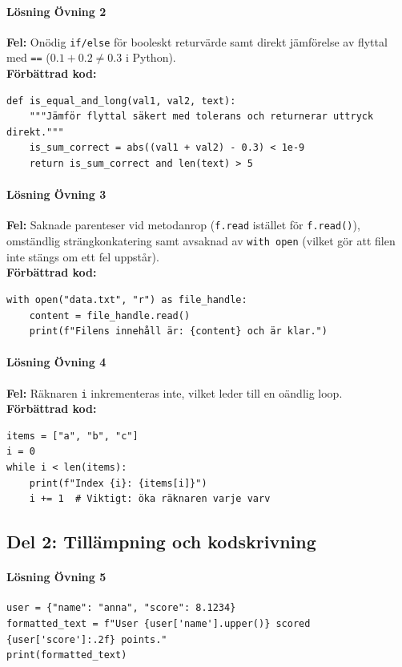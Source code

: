 \documentclass{article}
\begin{document}
\paragraph{Lösning Övning 2}
\textbf{Fel:} Onödig \texttt{if/else} för booleskt returvärde samt direkt jämförelse av flyttal med \texttt{==} ($0.1 + 0.2 \neq 0.3$ i Python). \\
\textbf{Förbättrad kod:}
\begin{lstlisting}
def is_equal_and_long(val1, val2, text):
    """Jämför flyttal säkert med tolerans och returnerar uttryck direkt."""
    is_sum_correct = abs((val1 + val2) - 0.3) < 1e-9
    return is_sum_correct and len(text) > 5
\end{lstlisting}

\paragraph{Lösning Övning 3}
\textbf{Fel:} Saknade parenteser vid metodanrop (\texttt{f.read} istället för \texttt{f.read()}), omständlig strängkonkatering samt avsaknad av \texttt{with open} (vilket gör att filen inte stängs om ett fel uppstår). \\
\textbf{Förbättrad kod:}
\begin{lstlisting}
with open("data.txt", "r") as file_handle:
    content = file_handle.read()
    print(f"Filens innehåll är: {content} och är klar.")
\end{lstlisting}

\paragraph{Lösning Övning 4}
\textbf{Fel:} Räknaren \texttt{i} inkrementeras inte, vilket leder till en oändlig loop. \\
\textbf{Förbättrad kod:}
\begin{lstlisting}
items = ["a", "b", "c"]
i = 0
while i < len(items):
    print(f"Index {i}: {items[i]}")
    i += 1  # Viktigt: öka räknaren varje varv
\end{lstlisting}

\bigskip
\subsection*{Del 2: Tillämpning och kodskrivning}

\paragraph{Lösning Övning 5}
\begin{lstlisting}
user = {"name": "anna", "score": 8.1234}
formatted_text = f"User {user['name'].upper()} scored {user['score']:.2f} points."
print(formatted_text)
\end{lstlisting}
\end{document}

